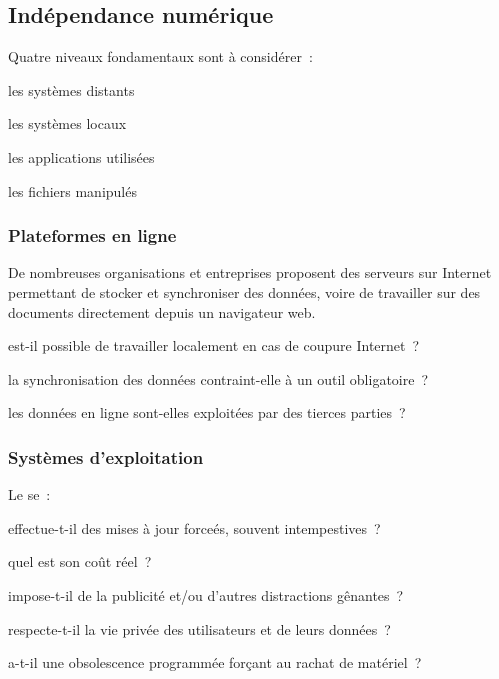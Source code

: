 \hr

\subsection{Indépendance numérique}

Quatre niveaux fondamentaux sont à considérer :
\begin{itmz}
\item{les systèmes distants}
\item{les systèmes locaux}
\item{les applications utilisées}
\item{les fichiers manipulés}
\end{itmz}

\subsubsection{Plateformes en ligne}

De nombreuses organisations et entreprises proposent des serveurs sur Internet
permettant de stocker et synchroniser des données, voire de travailler sur des
documents directement depuis un navigateur web.

\begin{itmz}
\item{est-il possible de travailler localement en cas de coupure Internet ?}
\item{la synchronisation des données contraint-elle à un outil obligatoire ?}
\item{les données en ligne sont-elles exploitées par des tierces parties ?}
\end{itmz}

\subsubsection{Systèmes d’exploitation}

Le \gls{se} :
\begin{itmz}
\item{effectue-t-il des mises à jour forceés, souvent intempestives ?}
\item{quel est son coût réel ?
    \begin{itmz}
    \item{impose-t-il de la publicité et/ou d’autres distractions gênantes ?}
    \item{respecte-t-il la vie privée des utilisateurs et de leurs données ?}
    \item{a-t-il une obsolescence programmée forçant au rachat de matériel ?}
    \end{itmz}
}
\end{itmz}

